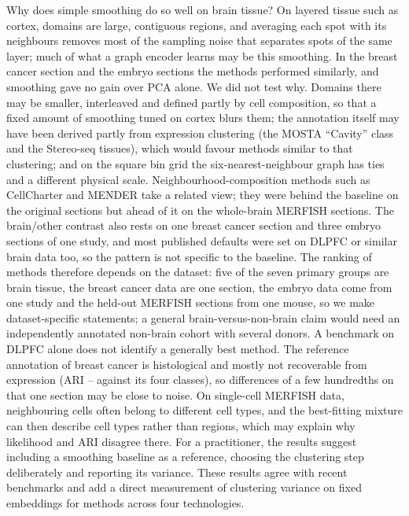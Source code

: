 \documentclass[unnumsec,webpdf,contemporary,large]{oup-authoring-template}
\begin{document}
Why does simple smoothing do so well on brain tissue? On layered tissue such as cortex, domains are large, contiguous regions, and
averaging each spot with its neighbours removes most of the sampling noise that separates spots of the same layer; much of what a
graph encoder learns may be this smoothing. In the breast cancer section and the embryo sections the methods performed similarly,
and smoothing gave no gain over PCA alone. We did not test why. Domains there may be smaller, interleaved and defined partly by
cell composition, so that a fixed amount of smoothing tuned on cortex blurs them; the annotation itself may have been derived partly from
expression clustering (the MOSTA ``Cavity'' class and the Stereo-seq tissues), which would favour methods similar to that clustering; and on the square bin grid the
six-nearest-neighbour graph has ties and a different physical scale. Neighbourhood-composition methods such as CellCharter \citep{varrone2024cellcharter} and MENDER \citep{yuan2024mender} take a related
view; they were behind the baseline on the original sections but ahead of it on the whole-brain MERFISH sections. The brain/other contrast also rests on one breast cancer
section and three embryo sections of one study, and most published defaults were set on DLPFC or similar brain data too, so the pattern is not specific to the
baseline. The ranking of methods therefore depends on the dataset: five of the seven primary groups are brain tissue, the breast cancer data are one
section, the embryo data come from one study and the held-out MERFISH sections from one mouse, so we make dataset-specific statements; a
general brain-versus-non-brain claim would need an independently annotated non-brain cohort with several donors. A benchmark on DLPFC alone
does not identify a generally best method. The reference annotation of breast cancer is histological and mostly not recoverable from expression (ARI \brcaCoarseLo--\brcaCoarseHi{} against its four classes), so
differences of a few hundredths on that one section may be close to noise. On single-cell MERFISH data, neighbouring cells often belong to different cell types, and the
best-fitting mixture can then describe cell types rather than regions, which may explain why likelihood and ARI disagree there. For a
practitioner, the results suggest including a smoothing baseline as a reference, choosing the clustering step deliberately and reporting its
variance. These results agree with recent benchmarks \citep{explanatory2026,hu2024gbbench,nar2025bench} and add a direct measurement
of clustering variance on fixed embeddings for \lotNMethods{} methods across four technologies.
\end{document}
